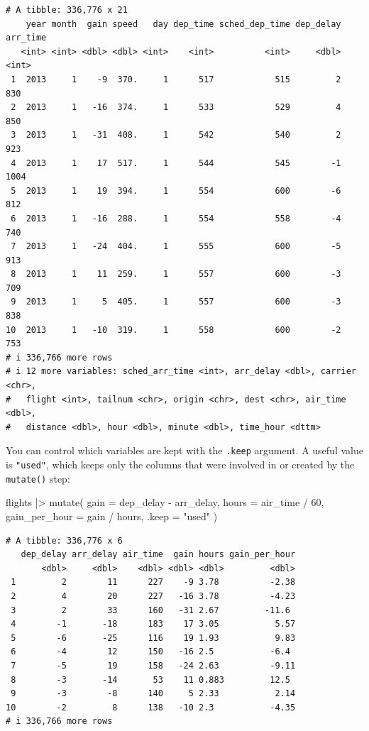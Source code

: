 \documentclass[
  letterpaper,
  DIV=11,
  numbers=noendperiod]{scrreprt}
\newenvironment{Shaded}{\begin{snugshade}}{\end{snugshade}}
\newcommand{\AttributeTok}[1]{\textcolor[rgb]{0.40,0.45,0.13}{#1}}
\newcommand{\DecValTok}[1]{\textcolor[rgb]{0.68,0.00,0.00}{#1}}
\newcommand{\FunctionTok}[1]{\textcolor[rgb]{0.28,0.35,0.67}{#1}}
\newcommand{\NormalTok}[1]{\textcolor[rgb]{0.00,0.23,0.31}{#1}}
\newcommand{\SpecialCharTok}[1]{\textcolor[rgb]{0.37,0.37,0.37}{#1}}
\newcommand{\StringTok}[1]{\textcolor[rgb]{0.13,0.47,0.30}{#1}}
\begin{document}
\begin{verbatim}
# A tibble: 336,776 x 21
    year month  gain speed   day dep_time sched_dep_time dep_delay arr_time
   <int> <int> <dbl> <dbl> <int>    <int>          <int>     <dbl>    <int>
 1  2013     1    -9  370.     1      517            515         2      830
 2  2013     1   -16  374.     1      533            529         4      850
 3  2013     1   -31  408.     1      542            540         2      923
 4  2013     1    17  517.     1      544            545        -1     1004
 5  2013     1    19  394.     1      554            600        -6      812
 6  2013     1   -16  288.     1      554            558        -4      740
 7  2013     1   -24  404.     1      555            600        -5      913
 8  2013     1    11  259.     1      557            600        -3      709
 9  2013     1     5  405.     1      557            600        -3      838
10  2013     1   -10  319.     1      558            600        -2      753
# i 336,766 more rows
# i 12 more variables: sched_arr_time <int>, arr_delay <dbl>, carrier <chr>,
#   flight <int>, tailnum <chr>, origin <chr>, dest <chr>, air_time <dbl>,
#   distance <dbl>, hour <dbl>, minute <dbl>, time_hour <dttm>
\end{verbatim}

You can control which variables are kept with the \texttt{.keep}
argument. A useful value is \texttt{"used"}, which keeps only the
columns that were involved in or created by the \texttt{mutate()} step:

\begin{Shaded}
\begin{Highlighting}[]
\NormalTok{flights }\SpecialCharTok{|\textgreater{}}
  \FunctionTok{mutate}\NormalTok{(}
    \AttributeTok{gain =}\NormalTok{ dep\_delay }\SpecialCharTok{{-}}\NormalTok{ arr\_delay,}
    \AttributeTok{hours =}\NormalTok{ air\_time }\SpecialCharTok{/} \DecValTok{60}\NormalTok{,}
    \AttributeTok{gain\_per\_hour =}\NormalTok{ gain }\SpecialCharTok{/}\NormalTok{ hours,}
    \AttributeTok{.keep =} \StringTok{"used"}
\NormalTok{  )}
\end{Highlighting}
\end{Shaded}

\begin{verbatim}
# A tibble: 336,776 x 6
   dep_delay arr_delay air_time  gain hours gain_per_hour
       <dbl>     <dbl>    <dbl> <dbl> <dbl>         <dbl>
 1         2        11      227    -9 3.78          -2.38
 2         4        20      227   -16 3.78          -4.23
 3         2        33      160   -31 2.67         -11.6 
 4        -1       -18      183    17 3.05           5.57
 5        -6       -25      116    19 1.93           9.83
 6        -4        12      150   -16 2.5           -6.4 
 7        -5        19      158   -24 2.63          -9.11
 8        -3       -14       53    11 0.883         12.5 
 9        -3        -8      140     5 2.33           2.14
10        -2         8      138   -10 2.3           -4.35
# i 336,766 more rows
\end{verbatim}
\end{document}
